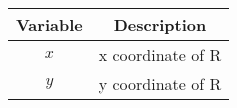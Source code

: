 \begin{tabular}[12pt]{ |c| c|}
    \hline
    \textbf{Variable} & \textbf{Description}\\ 
    \hline
    $x$ & x coordinate of R \\
    \hline 
    $y$ & y coordinate of R\\
    \hline   
    \end{tabular}

